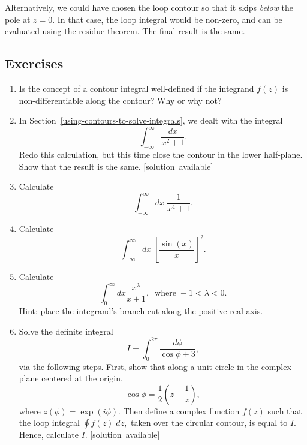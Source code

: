 \documentclass[10pt,a4paper]{article}
\begin{document}
Alternatively, we could have chosen the loop contour so that it skips
\emph{below} the pole at $z = 0$. In that case, the loop integral
would be non-zero, and can be evaluated using the residue theorem. The
final result is the same.

\subsection{Exercises}
\label{exercises}

\begin{enumerate}
\item
  Is the concept of a contour integral well-defined if the integrand
  $f(z)$ is non-differentiable along the contour? Why or why not?

\item
  In Section~\ref{using-contours-to-solve-integrals}, we dealt with
  the integral
  \begin{equation}
    \int_{-\infty}^\infty \frac{dx}{x^2 + 1}.
  \end{equation}
  Redo this calculation, but this time close the contour in the lower
  half-plane.  Show that the result is the same.
  \hfill{\scriptsize [solution~available]}

\item
  Calculate
  \begin{equation}
    \int_{-\infty}^\infty dx\; \frac{1}{x^4 + 1}.
  \end{equation}

\item
  Calculate
  \begin{equation}
    \int_{-\infty}^\infty dx\; \left[\frac{\sin(x)}{x}\right]^2.
  \end{equation}

\item
  Calculate
  \begin{equation}
    \int_0^\infty dx \frac{x^{\lambda}}{x+1}, \;\;\mathrm{where}\; -1 < \lambda < 0.
  \end{equation}
  Hint: place the integrand's branch cut along the positive real axis.

\item
  Solve the definite integral
  \begin{equation}
    I = \int_0^{2\pi} \frac{d\phi}{\cos\phi+3},
  \end{equation}
  via the following steps. First, show that along a unit circle in the
  complex plane centered at the origin,
  \begin{equation}
    \cos\phi = \frac{1}{2}\left(z+\frac{1}{z}\right),
  \end{equation}
  where $z(\phi) = \exp(i\phi)$. Then define a complex function $f(z)$
  such that the loop integral $\oint f(z) \;dz,$ taken over the
  circular contour, is equal to $I$. Hence, calculate
  $I$.
  \vskip -0.05in
  \hfill{\scriptsize [solution~available]}
  

\end{enumerate}
\end{document}
